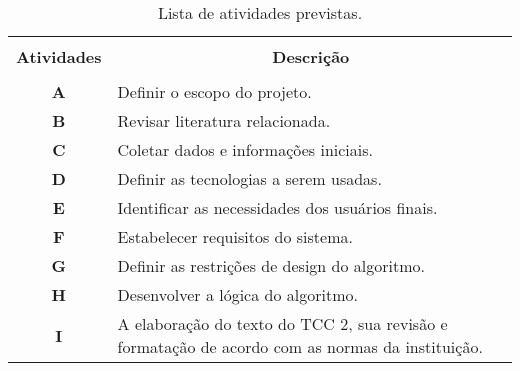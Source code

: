 \documentclass[tcc1,project]{classe_uftex/uftex}
\begin{document}
\begin{table}[!h]
  \centering
  \caption{Lista de atividades previstas.}\label{tb:atividades}
  \begin{tabular}{cp{9.4cm}}
    \hline \hline &\\[-0.4cm]
    {\bf Atividades} & \multicolumn{1}{c}{\bf Descrição} \\
    \hline
    &\\[-0.4cm]
    \textbf{A} &  Definir o escopo do projeto. \\[0.2cm]
    \textbf{B} &  Revisar literatura relacionada.\\[0.2cm]
    \textbf{C} &  Coletar dados e informações iniciais.\\[0.2cm]
    \textbf{D} &  Definir as tecnologias a serem usadas. \\[0.2cm]
    \textbf{E} &  Identificar as necessidades dos usuários finais. \\[0.2cm]
    \textbf{F} &  Estabelecer requisitos do sistema.\\[0.2cm]
    \textbf{G} &  Definir as restrições de design do algoritmo.\\[0.2cm]
    \textbf{H} &  Desenvolver a lógica do algoritmo. \\[0.2cm]
    \textbf{I} &  A elaboração do texto do TCC 2, sua revisão e formatação de acordo com as normas da instituição. \\[0.2cm]
    \hline \hline
  \end{tabular}
\end{table}


\end{document}
